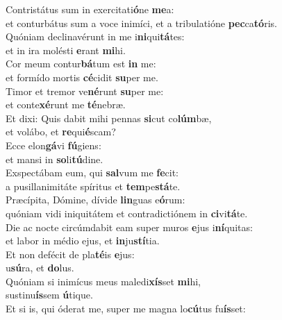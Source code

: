 \evenverse Contristátus sum in exercitati\textbf{ó}ne \textbf{me}a:~\*\\
\evenverse et conturbátus sum a voce inimíci, et a tribulatióne \textbf{pec}ca\textbf{tó}ris.\\
\oddverse Quóniam declinavérunt in me i\textbf{ni}qui\textbf{tá}tes:~\*\\
\oddverse et in ira molésti \textbf{e}rant \textbf{mi}hi.\\
\evenverse Cor meum contur\textbf{bá}tum est \textbf{in} me:~\*\\
\evenverse et formído mortis \textbf{cé}cidit \textbf{su}per me.\\
\oddverse Timor et tremor ve\textbf{né}runt \textbf{su}per me:~\*\\
\oddverse et conte\textbf{xé}runt me \textbf{té}nebræ.\\
\evenverse Et dixi: Quis dabit mihi pennas \textbf{si}cut co\textbf{lúm}bæ,~\*\\
\evenverse et volábo, et \textbf{re}qui\textbf{é}scam?\\
\oddverse Ecce elon\textbf{gá}vi \textbf{fú}giens:~\*\\
\oddverse et mansi in \textbf{so}li\textbf{tú}dine.\\
\evenverse Exspectábam eum, qui \textbf{sal}vum me \textbf{fe}cit:~\*\\
\evenverse a pusillanimitáte spíritus et \textbf{tem}pe\textbf{stá}te.\\
\oddverse Præcípita, Dómine, dívide \textbf{lin}guas e\textbf{ó}rum:~\*\\
\oddverse quóniam vidi iniquitátem et contradictiónem in \textbf{ci}vi\textbf{tá}te.\\
\evenverse Die ac nocte circúmdabit eam super muros \textbf{e}jus i\textbf{ní}quitas:~\*\\
\evenverse et labor in médio ejus, et \textbf{in}ju\textbf{stí}tia.\\
\oddverse Et non defécit de pla\textbf{té}is \textbf{e}jus:~\*\\
\oddverse u\textbf{sú}ra, et \textbf{do}lus.\\
\evenverse Quóniam si inimícus meus maledi\textbf{xís}set \textbf{mi}hi,~\*\\
\evenverse sustinu\textbf{ís}sem \textbf{ú}tique.\\
\oddverse Et si is, qui óderat me, super me magna lo\textbf{cú}tus fu\textbf{ís}set:~\*\\
